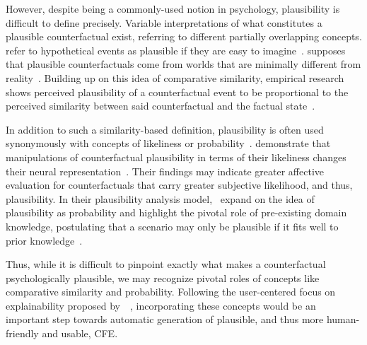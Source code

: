 However, despite being a commonly-used notion in psychology, plausibility is difficult to define precisely.
Variable interpretations of what constitutes a plausible counterfactual exist, referring to different partially overlapping concepts.
\citeauthor{kahneman_simulation_1982} refer to hypothetical events as plausible if they are easy to imagine~\citep{kahneman_simulation_1982}. 
\citeauthor{lewis_counterfactuals_1973} supposes that plausible counterfactuals come from worlds that are minimally different from reality~\citep{lewis_counterfactuals_1973}. 
Building up on this idea of comparative similarity, empirical research shows perceived plausibility of a counterfactual event to be proportional to the perceived similarity between said counterfactual and the factual state~\citep{stanley_counterfactual_2017, de_brigard_perceived_2021}.

In addition to such a similarity-based definition, plausibility is often used synonymously with concepts of likeliness or probability~\citep{pezdek_is_2006, de_brigard_remembering_2013}. 
\citeauthor{de_brigard_remembering_2013} demonstrate that manipulations of counterfactual plausibility in terms of their likeliness changes their neural representation~\citep{de_brigard_remembering_2013}.
Their findings may indicate greater affective evaluation for counterfactuals that carry greater subjective likelihood, and thus, plausibility.
In their plausibility analysis model,~\citeauthor{connell_model_2006} expand on the idea of plausibility as probability and highlight the pivotal role of pre-existing domain knowledge, postulating that a scenario may only be plausible if it fits well to prior knowledge~\citep{connell_model_2006}.

Thus, while it is difficult to pinpoint exactly what makes a counterfactual psychologically plausible, we may recognize pivotal roles of concepts like comparative similarity and probability.
Following the user-centered focus on explainability proposed by~\citeauthor{miller_explanation_2019}~\citep{miller_explanation_2019}, incorporating these concepts would be an important step towards automatic generation of plausible, and thus more human-friendly and usable, \gls{CFE}.


